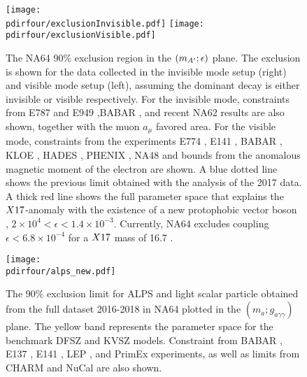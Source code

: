 \begin{figure}[tbh!]
  \centering
  \texttt{[image: \\pdirfour/exclusionInvisible.pdf]}
  \texttt{[image: \\pdirfour/exclusionVisible.pdf]}
  \caption[Exclusion limits in the $\dmplane$]{The NA64 90\% exclusion region in the $\dmplane$ plane. The exclusion is shown for the data collected in the invisible mode setup (right) and visible mode setup (left), assuming the dominant decay is either invisible or visible respectively\cite{NA64:2019imj,Banerjee:2019hmi}. For the invisible mode, constraints from E787 and E949 \cite{PhysRevD.89.095006,Essig:2013vha},BABAR \cite{PhysRevLett.119.131804}, and recent NA62 results \cite{CortinaGil:2019nuo} are also shown, together with the muon $a_{\mu}$ favored area. For the visible mode, constraints from the experiments E774 \cite{PhysRevLett.67.2942}, E141 \cite{PhysRevLett.59.755}, BABAR \cite{babar1}, KLOE \cite{kloe2}, HADES \cite{hades}, PHENIX \cite{phenix}, NA48 \cite{na48} and bounds from the anomalous magnetic moment of the electron \cite{PhysRevD.89.095006} are shown. A blue dotted line shows the previous limit obtained with the analysis of the 2017 data. A thick red line shows the full parameter space that explains the $X17$-anomaly with the existence of a new protophobic vector boson \cite{PhysRevD.95.035017}, $2 \times 10^{4} < \epsilon< 1.4 \times 10^{-3}$. Currently, NA64 excludes coupling $\epsilon < 6.8 \times 10^{-4}$ for a $X17$ mass of 16.7 \mev.}
  \label{fig:exclusion-dmplane}
\end{figure}

\begin{figure}[bth!]
  \centering
  \texttt{[image: \\pdirfour/alps\_new.pdf]}
  \caption[Exclusion limits in the $(m_{a};g_{a \gamma \gamma})$ plane for ALPS and light scalar]{The 90\% exclusion limit for ALPS and light scalar particle obtained from the full dataset 2016-2018 in NA64 plotted in the $(m_{a};g_{a \gamma \gamma})$ plane. The yellow band represents the parameter space for the benchmark DFSZ \cite{DINE1981199} and KVSZ \cite{PhysRevLett.43.103} models. Constraint from BABAR \cite{Dolan:2017osp}, E137 \cite{e137}, E141 \cite{blum}, LEP , and PrimEx \cite{PhysRevLett.123.071801} experiments, as well as limits from CHARM \cite{BERGSMA1985458} and NuCal \cite{Dobrich:2019dxc} are also shown.}
  \label{fig:exclusion-dmplane-alps}
\end{figure}

\newpage

